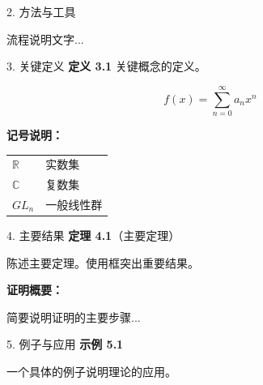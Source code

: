\documentclass[a0paper,portrait]{baposter}
\begin{document}
\begin{poster}
{\begin{posterbox}{2. 方法与工具}
        \vspace{0.5em}

        流程说明文字...
    \end{posterbox}

    \begin{posterbox}{3. 关键定义}
        \textbf{定义 3.1} 关键概念的定义。

        \[
        f(x) = \sum_{n=0}^{\infty} a_n x^n
        \]

        \vspace{0.5em}

        \textbf{记号说明：}

        \begin{tabular}{ll}
            $\mathbb{R}$ & 实数集 \\
            $\mathbb{C}$ & 复数集 \\
            $GL_n$ & 一般线性群
        \end{tabular}
    \end{posterbox}
}
{
    \begin{posterbox}{4. 主要结果}
        \textbf{定理 4.1}（主要定理）

        陈述主要定理。使用框突出重要结果。

        \begin{center}
        \end{center}

        \vspace{0.5em}

        \textbf{证明概要：}

        简要说明证明的主要步骤...
    \end{posterbox}

    \begin{posterbox}{5. 例子与应用}
        \textbf{示例 5.1}

        一个具体的例子说明理论的应用。

        \vspace{0.5em}

        \begin{center}
        \end{center}


\end{posterbox}}
\end{poster}
\end{document}
